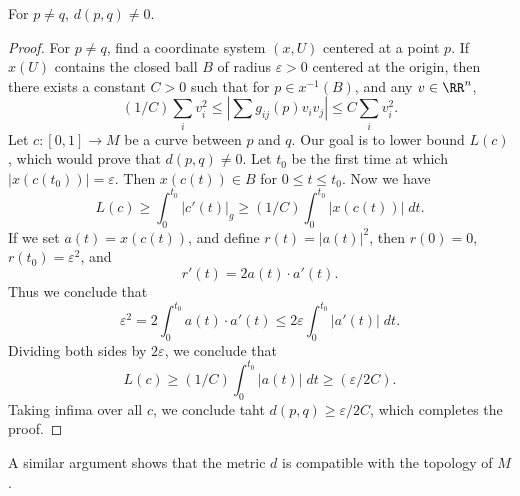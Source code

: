 \begin{theorem}
    For $p \neq q$, $d(p,q) \neq 0$.
\end{theorem}
\begin{proof}
    For $p \neq q$, find a coordinate system $(x,U)$ centered at a point $p$. If $x(U)$ contains the closed ball $B$ of radius $\varepsilon > 0$ centered at the origin, then there exists a constant $C > 0$ such that for $p \in x^{-1}(B)$, and any $v \in \RR^n$,
    \[ (1/C) \sum_i v_i^2 \leq \left| \sum g_{ij}(p) v_i v_j \right| \leq C \sum_i v_i^2. \]
    Let $c: [0,1] \to M$ be a curve between $p$ and $q$. Our goal is to lower bound $L(c)$, which would prove that $d(p,q) \neq 0$. Let $t_0$ be the first time at which $|x(c(t_0))| = \varepsilon$. Then $x(c(t)) \in B$ for $0 \leq t \leq t_0$. Now we have
    \[ L(c) \geq \int_0^{t_0} |c'(t)|_g \geq (1/C) \int_0^{t_0} |x(c(t))|\; dt. \]
    If we set $a(t) = x(c(t))$, and define $r(t) = |a(t)|^2$, then $r(0) = 0$, $r(t_0) = \varepsilon^2$, and
    \[ r'(t) = 2 a(t) \cdot a'(t). \]
    Thus we conclude that
    \[ \varepsilon^2 = 2 \int_0^{t_0} a(t) \cdot a'(t) \leq 2 \varepsilon \int_0^{t_0} |a'(t)|\; dt. \]
    Dividing both sides by $2 \varepsilon$, we conclude that
    \[ L(c) \geq (1/C) \int_0^{t_0} |a(t)|\; dt \geq (\varepsilon / 2C). \]
    Taking infima over all $c$, we conclude taht $d(p,q) \geq \varepsilon / 2C$, which completes the proof.
\end{proof}

A similar argument shows that the metric $d$ is compatible with the topology of $M$.

